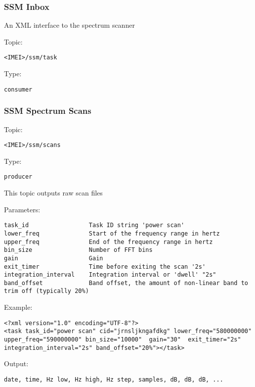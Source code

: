 \subsubsection{SSM Inbox}

An XML interface to the spectrum scanner
    
Topic:
\begin{lstlisting}<IMEI>/ssm/task\end{lstlisting}
Type:
\begin{lstlisting}consumer\end{lstlisting}

\subsubsection{SSM Spectrum Scans}

Topic:
\begin{lstlisting}<IMEI>/ssm/scans\end{lstlisting}
Type:
\begin{lstlisting}producer\end{lstlisting}
    
This topic outputs raw scan files

Parameters:

\begin{lstlisting}
task_id                 Task ID string 'power scan'
lower_freq              Start of the frequency range in hertz
upper_freq              End of the frequency range in hertz
bin_size                Number of FFT bins
gain                    Gain
exit_timer              Time before exiting the scan '2s'
integration_interval    Integration interval or 'dwell' "2s"
band_offset             Band offset, the amount of non-linear band to trim off (typically 20%)
\end{lstlisting}

Example:

\lstset{language=XML}
\begin{lstlisting}
<?xml version="1.0" encoding="UTF-8"?>
<task task_id="power scan" cid="jrnsljkngafdkg" lower_freq="580000000" upper_freq="590000000" bin_size="10000"  gain="30"  exit_timer="2s" integration_interval="2s" band_offset="20%"></task>
\end{lstlisting}

Output:
\begin{lstlisting}date, time, Hz low, Hz high, Hz step, samples, dB, dB, dB, ...\end{lstlisting}

